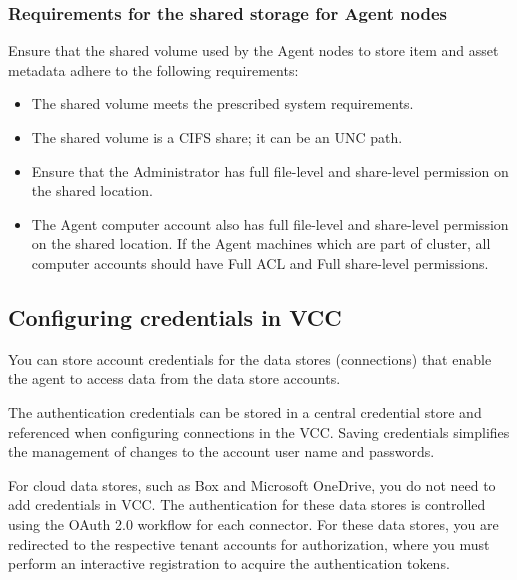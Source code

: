 \documentclass[letterpaper,10pt,english]{sphinxmanual}
\begin{document}
\subsubsection{Requirements for the shared storage for Agent nodes}
\label{\detokenize{mcdmp_app_ug:requirements-for-the-shared-storage-for-agent-nodes}}
Ensure that the shared volume used by the Agent nodes to store item and asset metadata adhere to the following requirements:
\begin{itemize}
\item {} 
The shared volume meets the prescribed system requirements.

\item {} 
The shared volume is a CIFS share; it can be an UNC path.

\item {} 
Ensure that the Administrator has full file-level and share-level permission on the shared location.

\item {} 
The Agent computer account also has full file-level and share-level permission on the shared location. If the Agent machines which are part of cluster, all computer accounts should have Full ACL and Full share-level permissions.
\begin{quote}
\label{\detokenize{mcdmp_app_ug:configuring-credentials}}\end{quote}

\end{itemize}


\subsection{Configuring credentials in VCC}
\label{\detokenize{mcdmp_app_ug:configuring-credentials-in-vcc}}\label{\detokenize{mcdmp_app_ug:configuring-credentials}}
You can store account credentials for the data stores (connections) that enable the agent to access data from the data store accounts.

The authentication credentials can be stored in a central credential store and referenced when configuring connections in the VCC. Saving credentials simplifies the management of changes to the account user name and passwords.

For cloud data stores, such as Box and Microsoft OneDrive, you do not need to add credentials in VCC. The authentication for these data stores is controlled using the OAuth 2.0 workflow for each connector. For these data stores, you are redirected to the respective tenant accounts for authorization, where you must perform an interactive registration to acquire the authentication tokens.
\end{document}
